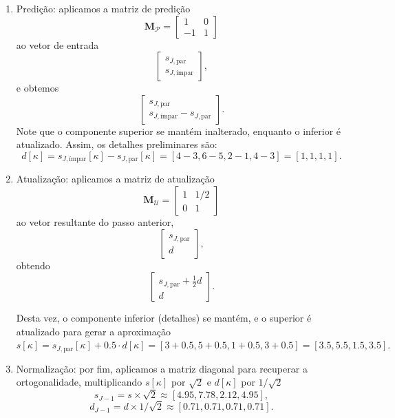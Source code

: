 \begin{example}
\begin{enumerate}
        \item Predição: aplicamos a matriz de predição
		\[
            \mathbf{M}_{\mathcal{P}} = \begin{bmatrix} 1 & 0 \\ -1 & 1 \end{bmatrix}
        \]
        ao vetor de entrada
		\[
            \begin{bmatrix} s_{J, \text{par}} \\ s_{J, \text{ímpar}} \end{bmatrix},
        \]
        e obtemos
		\[
            \begin{bmatrix} s_{J, \text{par}} \\ s_{J, \text{ímpar}} - s_{J, \text{par}} \end{bmatrix}.
        \]
        Note que o componente superior se mantém inalterado, enquanto o inferior é atualizado. Assim, os detalhes preliminares são:
		\[ 
        	d[\kappa] = s_{J, \text{ímpar}}[\kappa] - s_{J, \text{par}}[\kappa] = [4-3, 6-5, 2-1, 4-3] = [1, 1, 1, 1]. 
        \]

        \item Atualização: aplicamos a matriz de atualização
		\[
            \mathbf{M}_{\mathcal{U}} = \begin{bmatrix} 1 & 1/2 \\ 0 & 1 \end{bmatrix}
        \]
		ao vetor resultante do passo anterior,
		\[
            \begin{bmatrix} s_{J, \text{par}} \\ d \end{bmatrix},
        \]  
        obtendo
		\[
            \begin{bmatrix} s_{J, \text{par}} + \frac{1}{2}d \\ d \end{bmatrix}.
        \]

        Desta vez, o componente inferior (detalhes) se mantém, e o superior é atualizado para gerar a aproximação \( s[\kappa] = s_{J, \text{par}}[\kappa] + 0.5 \cdot d[\kappa] = [3+0.5, 5+0.5, 1+0.5, 3+0.5] = [3.5, 5.5, 1.5, 3.5]. \)

        

        \item Normalização: por fim, aplicamos a matriz diagonal para recuperar a ortogonalidade, multiplicando \(s[\kappa]\) por \(\sqrt{2}\) e \(d[\kappa]\) por \(1/\sqrt{2}\)
\[s_{J-1} = s \times \sqrt{2} \approx [4.95, 7.78, 2.12, 4.95], \]
\[ d_{J-1} = d \times 1/\sqrt{2} \approx [0.71, 0.71, 0.71, 0.71]. \]


\end{enumerate}
\end{example}
